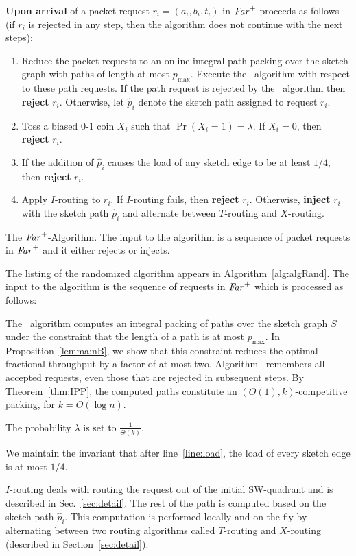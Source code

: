\documentclass[11pt]{article}
\newcommand{\route}{\text{\sc{ipp}}}
\newcommand{\IPP}{\route}
\newcommand{\pmax}{p_{\max}}
\newenvironment{proof sketch}[1]{\noindent {\emph{Proof sketch of #1:}}}{\hfill \qed}
\newcommand{\far}{\text{\emph{Far}}}
\begin{document}
\begin{algorithm}
    \textbf{Upon arrival} of a packet request $r_i = (a_i,b_i,t_i)$ in $\far^+$
    proceeds as follows (if $r_i$ is rejected in any step, then the algorithm does not continue with the next steps):
\begin{enumerate}
\item
\label{line:IPP}


Reduce the packet requests to an online integral path
packing over the sketch graph with paths of length at
most $\pmax$. Execute the \route\ algorithm with respect
to these path requests. If the path request is rejected
by the \route\ algorithm then \textbf{reject} $r_i$.
Otherwise, let $\hat p_i$ denote the sketch path assigned
to request $r_i$.

\item \label{line:toss} Toss a biased $0$-$1$ coin $X_i$ such that
  $\Pr (X_i=1)=\lambda$. If $X_i=0$, then \textbf{reject} $r_i$.
\item
\label{line:load}\label{item:quarter}
If the addition of $\hat p_i$ causes the load of any sketch edge to be at least
$1/4$, then \textbf{reject} $r_i$.
\item\label{line:I} Apply $I$-routing to $r_i$.  If $I$-routing fails,
  then \textbf{reject} $r_i$. Otherwise, \textbf{inject} $r_i$ with
  the sketch path $\hat p_i$ and alternate between $T$-routing and
  $X$-routing.
\end{enumerate}
\caption{The $\far^+$-Algorithm. The input to the algorithm is a sequence of packet requests in $\far^+$ and it either rejects or injects.}\label{alg:algRand}
\end{algorithm}


The listing of the randomized algorithm appears in
Algorithm~\ref{alg:algRand}.
The input to the algorithm is the sequence of requests in $\far^+$ which is processed as follows:
\begin{inparaenum}[(1)]
\item The \route\ algorithm computes an integral packing of paths over the sketch graph $S$
  under the constraint that the length of a path is at most
  $\pmax$. In Proposition~\ref{lemma:nB}, we show that this
  constraint reduces the optimal fractional throughput by a factor of
  at most two. Algorithm \IPP\ remembers all accepted requests, even
  those that are rejected in subsequent steps. By
  Theorem~\ref{thm:IPP}, the computed paths constitute an
  $(O(1),k)$-competitive packing, for $k=O(\log n)$.
\item The probability $\lambda$ is set to $\frac{1}{\Theta (k)}$.
\item We maintain the invariant that after line~\ref{line:load}, the
  load of every sketch edge is at most $1/4$.
\item $I$-routing deals with routing the request out of the initial
  SW-quadrant and is described in Sec.~\ref{sec:detail}.  The rest of
  the path is computed based on the sketch path $\hat p_i$. This
  computation is performed locally and on-the-fly by alternating between two routing
  algorithms called $T$-routing and $X$-routing (described in
  Section~\ref{sec:detail}).
\end{inparaenum}
\end{document}
